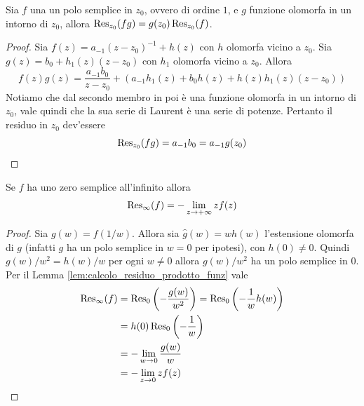 \begin{lemma}
  Sia $f$ una un polo semplice in $z_0$, ovvero di ordine $1$, e $g$ funzione 
  olomorfa in un intorno di $z_0$, allora $\operatorname{Res}_{z_0}(fg) = g(z_0) \operatorname{Res}_{z_0}(f)$.
  \label{lem:calcolo_residuo_prodotto_funz}
\end{lemma}
\begin{proof}
  Sia $f(z) = a_{-1}(z-z_0)^{-1} + h(z)$ con $h$ olomorfa vicino a $z_0$. Sia
  $g(z) = b_0 + h_1(z) (z-z_0)$ con $h_1$ olomorfa vicino a $z_0$. Allora
  \begin{equation*}
    f(z)g(z) = \frac{a_{-1}b_0}{z-z_0} + \left(a_{-1}h_1(z) + b_0h(z)
    + h(z)h_1(z)(z-z_0)\right)
  \end{equation*}
  Notiamo che dal secondo membro in poi è una funzione olomorfa in un
  intorno di $z_0$, vale quindi che la sua serie di Laurent è una serie di 
  potenze. Pertanto il residuo in $z_0$ dev'essere
  \begin{equation*}
    \operatorname{Res}_{z_0}(fg) = a_{-1}b_0 = a_{-1}g(z_0)
  \end{equation*}
\end{proof}

\begin{corollary}
  Se $f$ ha uno zero semplice all'infinito allora 
  \begin{equation*}
    \operatorname{Res}_\infty(f) = - \lim_{z \to +\infty} z f(z)
  \end{equation*}
  \label{cor:calcolo_residuo_infinito}
\end{corollary}
\begin{proof}
  Sia $g(w) = f(1/w)$. Allora sia $\hat{g}(w) = w h(w)$ l'estensione olomorfa di
  $g$ (infatti $g$ ha un polo semplice in $w = 0$ per ipotesi), con $h(0) \neq 0$. 
  Quindi $g(w)/w^2 = h(w)/w$ per ogni $w \neq 0$ allora $g(w)/w^2$ ha un polo 
  semplice in $0$. Per il Lemma \ref{lem:calcolo_residuo_prodotto_funz} vale 
  \begin{align*}
    \operatorname{Res}_\infty(f) & = \operatorname{Res}_0\left( -\frac{g(w)}{w^2} \right)
    = \operatorname{Res}_0\left(-\frac{1}{w} h(w)\right) \\
    & = h(0) \operatorname{Res}_0 \left( -\frac{1}{w} \right) \\
    & = - \lim_{w \to 0} \frac{g(w)}{w} \\
    & = - \lim_{z \to 0} z f(z)
  \end{align*}
\end{proof}

